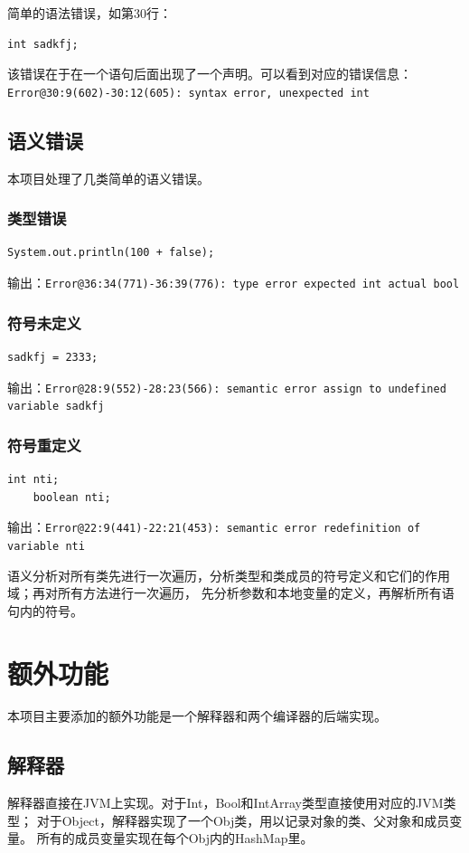 \documentclass[a4paper]{article}
\begin{document}
简单的语法错误，如第30行：
\begin{lstlisting}[style=minijava]
    int sadkfj;
\end{lstlisting} \par
该错误在于在一个语句后面出现了一个声明。可以看到对应的错误信息：
{\tt Error@30:9(602)-30:12(605): syntax error, unexpected int}

\subsection{语义错误}
本项目处理了几类简单的语义错误。
\subsubsection{类型错误}
\begin{lstlisting}[style=minijava]
    System.out.println(100 + false);
\end{lstlisting} \par
输出：{\tt Error@36:34(771)-36:39(776): type error expected int actual bool}
\subsubsection{符号未定义}
\begin{lstlisting}[style=minijava]
    sadkfj = 2333;
\end{lstlisting} \par
输出：{\tt Error@28:9(552)-28:23(566): semantic error assign to undefined variable sadkfj}
\subsubsection{符号重定义}
\begin{lstlisting}[style=minijava]
    int nti;
    boolean nti;
\end{lstlisting} \par
输出：{\tt Error@22:9(441)-22:21(453): semantic error redefinition of variable nti}
\par
语义分析对所有类先进行一次遍历，分析类型和类成员的符号定义和它们的作用域；再对所有方法进行一次遍历，
先分析参数和本地变量的定义，再解析所有语句内的符号。

\section{额外功能}
本项目主要添加的额外功能是一个解释器和两个编译器的后端实现。

\subsection{解释器}
解释器直接在JVM上实现。对于Int，Bool和IntArray类型直接使用对应的JVM类型；
对于Object，解释器实现了一个Obj类，用以记录对象的类、父对象和成员变量。
所有的成员变量实现在每个Obj内的HashMap里。
\end{document}
